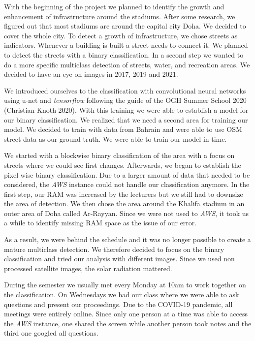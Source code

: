 \documentclass[
]{article}
\begin{document}
With the beginning of the project we planned to identify the growth and
enhancement of infrastructure around the stadiums. After some research,
we figured out that most stadiums are around the capital city Doha. We
decided to cover the whole city. To detect a growth of infrastructure,
we chose streets as indicators. Whenever a building is built a street
needs to connect it. We planned to detect the streets with a binary
classification. In a second step we wanted to do a more specific
multiclass detection of streets, water, and recreation areas. We decided
to have an eye on images in 2017, 2019 and 2021.

We introduced ourselves to the classification with convolutional neural
networks using u-net and \emph{tensorflow} following the guide of the
OGH Summer School 2020 (Christian Knoth 2020). With this training we
were able to establish a model for our binary classification. We
realized that we need a second area for training our model. We decided
to train with data from Bahrain and were able to use OSM street data as
our ground truth. We were able to train our model in time.

We started with a blockwise binary classification of the area with a
focus on streets where we could see first changes. Afterwards, we began
to establish the pixel wise binary classification. Due to a larger
amount of data that needed to be considered, the \emph{AWS} instance
could not handle our classification anymore. In the first step, our RAM
was increased by the lecturers but we still had to downsize the area of
detection. We then chose the area around the Khalifa stadium in an outer
area of Doha called Ar-Rayyan. Since we were not used to \emph{AWS}, it
took us a while to identify missing RAM space as the issue of our error.

As a result, we were behind the schedule and it was no longer possible
to create a mature multiclass detection. We therefore decided to focus
on the binary classification and tried our analysis with different
images. Since we used non processed satellite images, the solar
radiation mattered.

During the semester we usually met every Monday at 10am to work together
on the classification. On Wednesdays we had our class where we were able
to ask questions and present our proceedings. Due to the COVID-19
pandemic, all meetings were entirely online. Since only one person at a
time was able to access the \emph{AWS} instance, one shared the screen
while another person took notes and the third one googled all questions.
\end{document}
